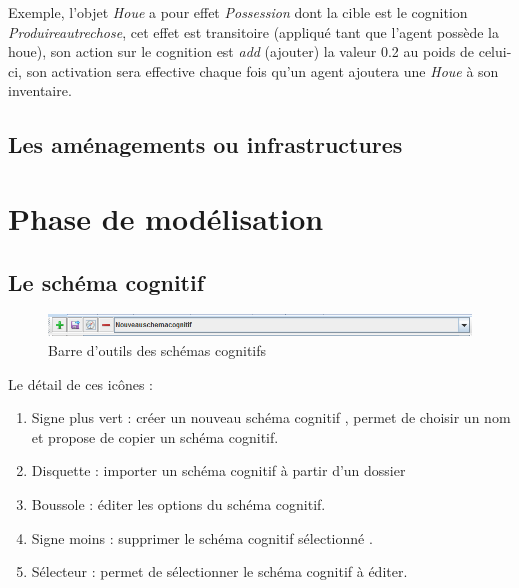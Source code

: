 	Exemple, l'objet \textit{Houe} a pour effet \textit{Possession} dont la cible est le cognition \textit{Produireautrechose}, cet effet est transitoire (appliqué tant que l'agent possède la houe), son action sur le cognition est \textit{add} (ajouter) la valeur 0.2 au poids de celui-ci, son activation sera effective chaque fois qu'un agent ajoutera une \textit{Houe} à son inventaire.

\newpage
	
	
\subsection{Les aménagements ou infrastructures}	
		
	
\section{Phase de modélisation}

\subsection{Le schéma cognitif}

\begin{figure}[!ht]
	\begin{center}
	\includegraphics[scale=0.6]{DocumentationSimulation/images/ToolbarSchemaCognitif.png}
	\caption[Interface]{Barre d'outils des schémas cognitifs\\}
	\label{Interface d'édition de cogniton}
	\end{center}
	\end{figure}

Le détail de ces icônes :

\begin{enumerate}
\item Signe plus vert : créer un nouveau schéma cognitif , permet de choisir un nom et propose de copier un schéma cognitif.
\item Disquette : importer un schéma cognitif à partir d'un dossier
\item Boussole : éditer les options du schéma cognitif.
\item Signe moins : supprimer le schéma cognitif sélectionné .
\item Sélecteur : permet de sélectionner le schéma cognitif à éditer.
\end{enumerate}


